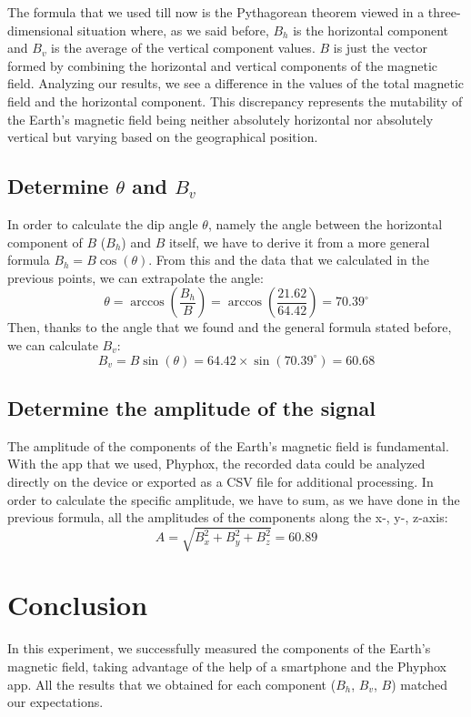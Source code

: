 \documentclass[notitlepage]{report}
\newcounter{theo}[section]\setcounter{theo}{0}
\numberwithin{equation}{section}
\theoremstyle{plain}
\theoremstyle{definition}
\theoremstyle{remark}
\begin{document}
The formula that we used till now is the Pythagorean theorem viewed in a three-dimensional situation where, as we said before, $B_h$ is the horizontal component and $B_v$ is the average of the vertical component values.
$B$ is just the vector formed by combining the horizontal and vertical components of the magnetic field. Analyzing our results, we see a difference in the values of the total magnetic field and the horizontal component. This discrepancy represents the mutability of the Earth’s magnetic field being neither absolutely horizontal nor absolutely vertical but varying based on the geographical position.

\subsection{Determine $\theta$ and $B_v$}
In order to calculate the dip angle $\theta$, namely the angle between the horizontal component of $B$ ($B_h$) and $B$ itself, we have to derive it from a more general formula $B_h = B \cos(\theta)$.
From this and the data that we calculated in the previous points, we can extrapolate the angle:
\[ \theta = \arccos\left(\frac{B_h}{B}\right) = \arccos\left(\frac{21.62}{64.42}\right) = 70.39^\circ \]
Then, thanks to the angle that we found and the general formula stated before, we can calculate $B_v$:
\[ B_v = B \sin(\theta) = 64.42 \times \sin(70.39^\circ) = 60.68 \]

\subsection{Determine the amplitude of the signal}
The amplitude of the components of the Earth’s magnetic field is fundamental. With the app that we used, Phyphox, the recorded data could be analyzed directly on the device or exported as a CSV file for additional processing.
In order to calculate the specific amplitude, we have to sum, as we have done in the previous formula, all the amplitudes of the components along the x-, y-, z-axis:
\[ A = \sqrt{B_x^2 + B_y^2 + B_z^2} = 60.89 \]

\section{Conclusion}
In this experiment, we successfully measured the components of the Earth’s magnetic field, taking advantage of the help of a smartphone and the Phyphox app. All the results that we obtained for each component ($B_h$, $B_v$, $B$) matched our expectations.
\end{document}
